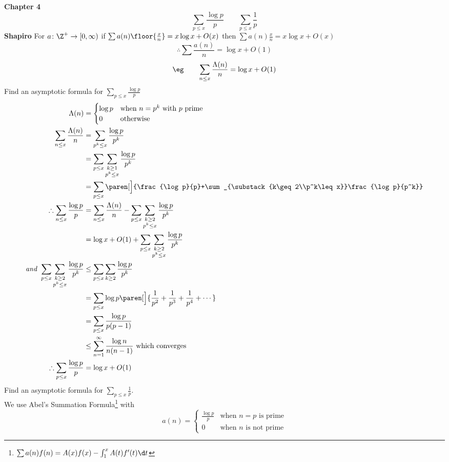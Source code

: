 \textbf{Chapter 4}
\[ \sum_{p\leq x}\frac{\log p}{p} \qquad \sum_{p\leq x}\frac1p \]
\textbf{Shapiro} For $a\colon\Z^+\to[0,\infty)$ if $\sum a(n)\floor{\frac xn}=x\log x+O(x)$ then $\sum a(n)\frac xn=x\log x+O(x)$
\[ \therefore \sum\frac{a(n)}n = \log x + O(1) \]
\[ \eg \qquad \sum_{n\leq x}\frac{\Lambda(n)}{n} = \log x + O(1) \]
\eg Find an asymptotic formula for $\sum_{p\leq x}\frac{\log p}{p}$ \\
\soln
\begin{align*}
\Lambda(n) &= \begin{cases}
\log p & \text{when $n=p^k$ with $p$ prime} \\
0 & \text{otherwise}
\end{cases} \\
\sum_{n\leq x}\frac{\Lambda(n)}{n} &= \sum_{p^k\leq x}\frac{\log p}{p^k} \\
&= \sum_{p\leq x}\sum_{\substack{k\geq1\\p^k\leq x}} \frac{\log p}{p^k} \\
&= \sum_{p\leq x}\paren[\Big]{\frac{\log p}{p}+\sum_{\substack{k\geq2\\p^k\leq x}}\frac{\log p}{p^k}} \\
\therefore \sum_{n\leq x}\frac{\log p}{p} &= \sum_{n\leq x}\frac{\Lambda(n)}{n} - \sum_{p\leq x}\sum_{\substack{k\geq2\\p^k\leq x}}\frac{\log p}{p^k} \\
&= \log x + O(1) + \sum_{p\leq x}\sum_{\substack{k\geq2\\p^k\leq x}}\frac{\log p}{p^k} \\
\text{\emph{and} } \sum_{p\leq x}\sum_{\substack{k\geq2\\p^k\leq x}}\frac{\log p}{p^k} &\leq \sum_{p\leq x}\sum_{k\geq2}\frac{\log p}{p^k} \\
&= \sum_{p\leq x}\log p\paren[\Big]{\frac1{p^2}+\frac1{p^3}+\frac1{p^4}+\dotsb} \\
&= \sum_{p\leq x}\frac{\log p}{p(p-1)} \\
&\leq \sum_{n=1}^\infty \frac{\log n}{n(n-1)} \text{ which converges} \\
\therefore \sum_{p\leq x}\frac{\log p}{p} &= \log x + O(1)
\end{align*}
\eg Find an asymptotic formula for $\sum_{p\leq x}\frac1p$. \\
\soln We use Abel's Summation Formula\footnote{$\sum a(n)f(n)=A(x)f(x)-\int_1^xA(t)f'(t)\d t$} with
\[ a(n) = \begin{cases}
\frac{\log p}{p} & \text{when $n=p$ is prime} \\
0 & \text{when $n$ is not prime}
\end{cases} \]
